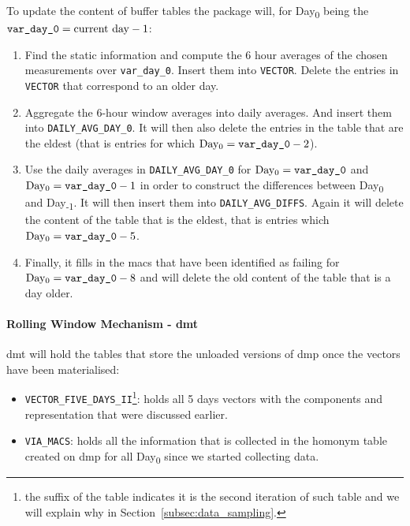 To update the content of buffer tables the package will, for Day\textsubscript{0} being the $ \text{\texttt{var\_day\_0}}=\text{current day} - 1$:
\begin{enumerate}
\item Find the static information and compute the 6 hour averages of the chosen measurements over \texttt{var\_day\_0}. Insert them into \texttt{VECTOR}. Delete the entries in \texttt{VECTOR} that correspond to an older day.
\item Aggregate the 6-hour window averages into daily averages. And insert them into \texttt{DAILY\_AVG\_DAY\_0}. It will then also delete the entries in the table that are the eldest (that is entries for which $\text{Day\textsubscript{0}}=\text{\texttt{var\_day\_0}}-2$).
\item Use the daily averages in \texttt{DAILY\_AVG\_DAY\_0} for $\text{Day\textsubscript{0}}=\text{\texttt{var\_day\_0}}$ and $\text{Day\textsubscript{0}}=\text{\texttt{var\_day\_0}}-1$ in order to construct the differences between Day\textsubscript{0} and Day\textsubscript{-1}. It will then insert them into \texttt{DAILY\_AVG\_DIFFS}. Again it will delete the content of the table that is the eldest, that is entries which $\text{Day\textsubscript{0}}=\text{\texttt{var\_day\_0}}-5$.
\item Finally, it fills in the \acrshort{mac}s that have been identified as failing for $\text{Day\textsubscript{0}}=\text{\texttt{var\_day\_0}}-8$ and will delete the old content of the table that is a day older. 
\end{enumerate}

\paragraph{Rolling Window Mechanism - \acrshort{dmt}}
\acrshort{dmt} will hold the tables that store the unloaded versions of \acrshort{dmp} once the vectors have been materialised:
\begin{itemize}
	\item \texttt{VECTOR\_FIVE\_DAYS\_II}\footnote{the suffix of the table indicates it is the second iteration of such table and we will explain why in Section~\ref{subsec:data_sampling}.}: holds all 5 days vectors with the components and representation that were discussed earlier.
	\item \texttt{VIA\_MACS}: holds all the information that is collected in the homonym table created on \acrshort{dmp} for all Day\textsubscript{0} since we started collecting data.
\end{itemize}

